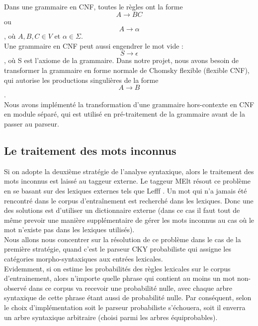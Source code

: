\documentclass[12pt]{article}
\begin{document}
Dans une grammaire en
CNF, toutes le r\`egles ont la forme $$A \rightarrow BC$$ ou $$A \rightarrow
\alpha$$, o\`u $A,B,C \in V$ et $\alpha \in \Sigma$. \\

Une grammaire en CNF peut
aussi engendrer le mot vide : $$S \rightarrow \epsilon$$, o\`u S est l'axiome de
la grammaire.
Dans notre projet, nous avons besoin de transformer la grammaire en forme
normale de Chomsky flexible (flexible CNF), qui autorise les productions
singuli\`eres de la forme $$A \rightarrow B$$. \\

Nous avons impl\'ement\'e la transformation d'une grammaire hors-contexte en CNF en
module s\'epar\'e, qui est utilis\'e en pr\'e-traitement de la grammaire avant
de la passer au parseur. 

\subsection{Le traitement des mots inconnus}

Si on adopte la deuxi\`eme strat\'egie de l'analyse syntaxique, alors le
traitement des mots inconnus est laiss\'e au taggeur externe.
Le taggeur MElt r\'esout ce probl\`eme en se basant sur des lexiques externes tels
que Lefff \cite{Lefff}. Un mot qui n'a jamais \'et\'e rencontr\'e dans le corpus
d'entra\^inement est recherch\'e dans les lexiques. Donc une des solutions est
d'utiliser un dictionnaire externe (dans ce cas il faut tout de m\^eme prevoir
une mani\`ere suppl\'ementaire de g\'erer les mots inconnus au cas o\`u le mot n'existe
pas dans les lexiques utilis\'es).\\

Nous allons nous concentrer sur la r\'esolution de ce probl\`eme dans le cas de la
premi\`ere strat\'egie, quand c'est le parseur CKY probabiliste qui assigne les
cat\'egories morpho-syntaxiques aux entr\'ees lexicales. \\

Evidemment, si on estime
les probabilit\'es des r\`egles lexicales sur le corpus d'entrainement, alors
n'importe quelle phrase qui contient au moins un mot non-observ\'e dans ce corpus
va recevoir une probabilit\'e nulle, avec chaque arbre syntaxique de cette phrase
\'etant aussi de probabilit\'e nulle. Par cons\'equent, selon le choix
d'impl\'ementation soit le parseur probabiliste s'\'echouera, soit il enverra un
arbre syntaxique arbitraire (choisi parmi les arbres \'equiprobables). \\
\end{document}
